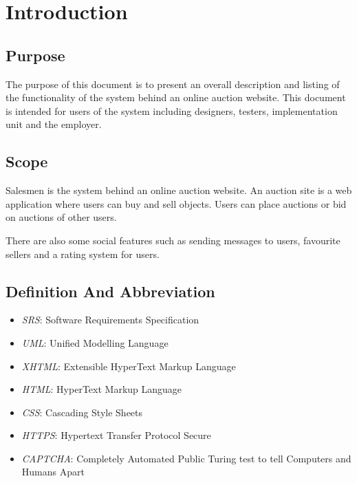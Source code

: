 \chapter{Introduction}
\section{Purpose}

	The purpose of this document is to present an overall description and 
	listing of the functionality of the system behind an online auction 
	website. This document is intended for users of the system including
	designers, testers, implementation unit and the employer.
	
\section{Scope}

	Salesmen is the system behind an online auction website. An auction site 
	is a web application where users can buy and sell objects. Users can 
	place auctions or bid on auctions of other users. 
	
	There are also some social features such as sending messages to users,
	favourite sellers and a rating system for users.
	
\section{Definition And Abbreviation}

	\begin{itemize}
		\item \emph{SRS}: Software Requirements Specification
		\item \emph{UML}: Unified Modelling Language
		\item \emph{XHTML}: Extensible HyperText Markup Language
		\item \emph{HTML}: HyperText Markup Language
		\item \emph{CSS}: Cascading Style Sheets
		\item \emph{HTTPS}: Hypertext Transfer Protocol Secure
		\item \emph{CAPTCHA}: Completely Automated Public Turing test to tell Computers and Humans Apart
	\end{itemize}
	
